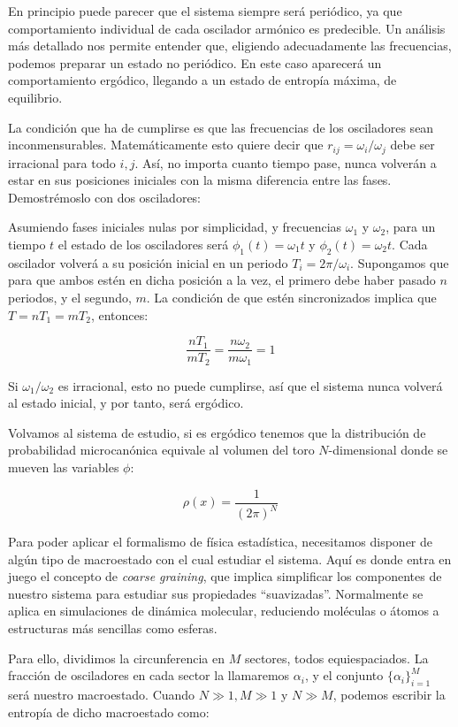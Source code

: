 \documentclass[11pt, a4paper]{article} %
\theoremstyle{named}
\begin{document}
En principio puede parecer que el sistema siempre será periódico, ya que comportamiento individual de cada oscilador armónico es predecible. Un análisis más detallado nos permite entender que, eligiendo adecuadamente las frecuencias, podemos preparar un estado no periódico. En este caso aparecerá un comportamiento ergódico, llegando a un estado de entropía máxima, de equilibrio.

La condición que ha de cumplirse es que las frecuencias de los osciladores sean inconmensurables. Matemáticamente esto quiere decir que $r_{ij}={\omega_i}/{\omega_j}$ debe ser irracional para todo $i, j$. Así, no importa cuanto tiempo pase, nunca volverán a estar en sus posiciones iniciales con la misma diferencia entre las fases. Demostrémoslo con dos osciladores:

Asumiendo fases iniciales nulas por simplicidad, y frecuencias $\omega_1$ y $\omega_2$, para un tiempo $t$ el estado de los osciladores será $\phi_1(t) =  \omega_1 t$ y $\phi_2(t) = \omega_2 t$. Cada oscilador volverá a su posición inicial en un periodo $T_i = 2\pi / \omega_i$. Supongamos que para que ambos estén en dicha posición a la vez, el primero debe haber pasado $n$ periodos, y el segundo, $m$. La condición de que estén sincronizados implica que $T = nT_1 = mT_2$, entonces:

$$
\frac{nT_1}{mT_2} = \frac{n \omega_2}{m \omega_1} = 1
$$

Si $\omega_1 / \omega_2$ es irracional, esto no puede cumplirse, así que el sistema nunca volverá al estado inicial, y por tanto, será ergódico.

Volvamos al sistema de estudio, si es ergódico tenemos que la distribución de probabilidad microcanónica equivale al volumen del toro $N$-dimensional donde se mueven las variables $\phi$:

$$
\rho (x) = \frac{1}{(2\pi)^N}
$$

Para poder aplicar el formalismo de física estadística, necesitamos disponer de algún tipo de macroestado con el cual estudiar el sistema. Aquí es donde entra en juego el concepto de \textit{coarse graining}, que implica simplificar los componentes de nuestro sistema para estudiar sus propiedades ``suavizadas''. Normalmente se aplica en simulaciones de dinámica molecular, reduciendo moléculas o átomos a estructuras más sencillas como esferas.

Para ello, dividimos la circunferencia en $M$ sectores, todos equiespaciados. La fracción de osciladores en cada sector la llamaremos $\alpha_i$, y el conjunto $\{\alpha_i\}_{i=1}^M$ será nuestro macroestado.
Cuando $N \gg 1, M \gg 1$ y $N \gg M$, podemos escribir la entropía de dicho macroestado como:
\end{document}
